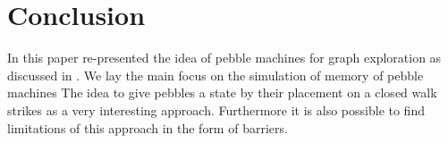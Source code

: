 \documentclass[oneside]{scrartcl}
\begin{document}
\section{Conclusion}
In this paper re-presented the idea of pebble machines for graph exploration
as discussed in \cite{pebbles}. We lay the main focus on the simulation of
memory of pebble machines The idea to give pebbles a state by their placement
on a closed walk strikes as a very interesting approach. Furthermore it is also
possible to find limitations of this approach in the form of barriers.

\printbibliography
\end{document}
